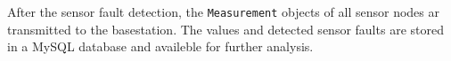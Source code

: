 \documentclass[12pt,a4paper]{scrartcl}
\begin{document}




After the sensor fault detection, the \texttt{Measurement} objects of all sensor nodes ar transmitted to the basestation.
The values and detected sensor faults are stored in a MySQL database and availeble for further analysis.


%


\end{document}
